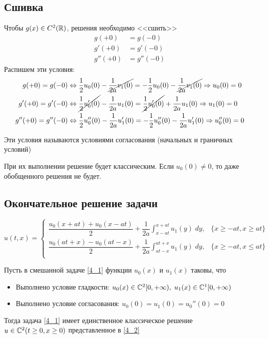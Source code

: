 \subsection{Сшивка}
Чтобы $g(x) \in C^2(\mathbb{R})$, решения необходимо <<сшить>>
\begin{align*}
    g(+0) &= g(-0) \\
    g'(+0) &= g'(-0) \\
    g''(+0) &= g''(-0)
\end{align*}
Распишем эти условия:
\begin{align*}
     g(+0) = g(-0) &\Leftrightarrow 
    \frac{1}{2}u_0(0) - \cancel{\frac{1}{2a}v_1(0)} = -\frac{1}{2}u_0(0) - \cancel{\frac{1}{2a}v_1(0)} \Rightarrow u_0(0) = 0 \\
     g'(+0) = g'(-0) &\Leftrightarrow \cancel{\frac{1}{2}u'_0(0)} - \frac{1}{2a}u_1(0) =
    \cancel{\frac{1}{2}u'_0(0)} + \frac{1}{2a}u_1(0) \Rightarrow u_1(0) = 0 \\
     g''(+0) = g''(-0) &\Leftrightarrow \frac{1}{2} u''_0(0) - \frac{1}{2a} u_1'(0) = -\frac{1}{2}u_0''(0) - \frac{1}{2a} u_1'(0) \Rightarrow u_0''(0) = 0
\end{align*}

\begin{definition}
    Эти условия называются условиями согласования (начальных и граничных условий)
\end{definition}

При их выполнении решение будет классическим. Если $u_0(0) \ne 0$, то даже обобщенного решения не будет.

\subsection{Окончательное решение задачи}

\begin{equation} \label{4_2}
        u(t, x) = \begin{cases}
            \dfrac{u_0(x+at) + u_0(x-at)}{2} + \dfrac{1}{2a}\displaystyle\int_{x-at}^{x+at}u_1(y)\;dy, & \{x\ge -at, x\ge at\} \\
            \dfrac{u_0(at+x) - u_0(at-x)}{2} + \dfrac{1}{2a}\displaystyle\int_{at-x}^{at+x}u_1(y)\;dy, & \{x\ge -at, x\le at\} \\
        \end{cases}
\end{equation}

\begin{theorem}
    Пусть в смешанной задаче \ref{4_1} функции $u_0(x)$ и $u_1(x)$ таковы, что 
    \begin{itemize}
        \item Выполнено условие гладкости: $u_0(x)\in \mathbb{C}^2[0, +\infty), \; u_1(x) \in \mathbb{C}^1[0, +\infty)$
        \item Выполнено условие согласования: $u_0(0) = u_1(0) = u_0''(0) = 0$
    \end{itemize}
    Тогда задача \ref{4_1} имеет единственное классическое решение $u \in \mathbb{C}^2(t \ge 0, x\ge 0)$ представленное в \ref{4_2}
\end{theorem}


